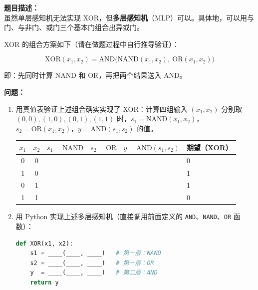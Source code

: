 \documentclass[a4paper,11pt]{ctexart}
\begin{document}
\begin{problembox}
    \textbf{题目描述：}\\
    虽然单层感知机无法实现 XOR，但\textbf{多层感知机}（MLP）可以。具体地，可以用与门、与非门、或门三个基本门组合出异或门。

    XOR 的组合方案如下（请在做题过程中自行推导验证）：

    \[
    \text{XOR}(x_1, x_2)
    = \text{AND}\!\Big(\text{NAND}(x_1, x_2),\ \text{OR}(x_1, x_2)\Big)
    \]

    即：先同时计算 NAND 和 OR，再把两个结果送入 AND。

    \vspace{0.2cm}
    \textbf{问题：}
    \begin{enumerate}[(1)]
        \item 用真值表验证上述组合确实实现了 XOR：计算四组输入 $(x_1, x_2)$ 分别取 $(0,0), (1,0), (0,1), (1,1)$ 时，$s_1 = \text{NAND}(x_1,x_2)$，$s_2 = \text{OR}(x_1,x_2)$，$y = \text{AND}(s_1, s_2)$ 的值。

        \begin{center}
        \begin{tabular}{cccccl}
            \toprule
            $x_1$ & $x_2$ & $s_1 = \text{NAND}$ & $s_2 = \text{OR}$ & $y = \text{AND}(s_1, s_2)$ & 期望（XOR） \\
            \midrule
            0 & 0 & \underline{\quad} & \underline{\quad} & \underline{\quad} & 0 \\
            1 & 0 & \underline{\quad} & \underline{\quad} & \underline{\quad} & 1 \\
            0 & 1 & \underline{\quad} & \underline{\quad} & \underline{\quad} & 1 \\
            1 & 1 & \underline{\quad} & \underline{\quad} & \underline{\quad} & 0 \\
            \bottomrule
        \end{tabular}
        \end{center}

        \item 用 Python 实现上述多层感知机（直接调用前面定义的 \texttt{AND}、\texttt{NAND}、\texttt{OR} 函数）：

        \begin{lstlisting}[language=Python]
def XOR(x1, x2):
    s1 = ____(____, ____)   # 第一层：NAND
    s2 = ____(____, ____)   # 第一层：OR
    y  = ____(____, ____)   # 第二层：AND
    return y
        \end{lstlisting}


\end{enumerate}
\end{problembox}
\end{document}
